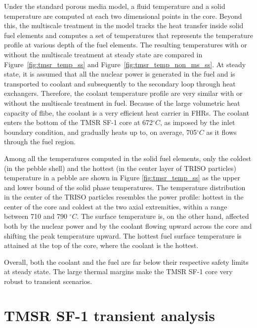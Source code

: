 \documentclass{elsarticle}
\begin{document}
Under the standard porous media model, a fluid temperature and a solid temperature are computed at each two dimensional points in the core. Beyond this, the multiscale treatment in the model tracks the heat transfer inside solid fuel elements and computes a set of temperatures that represents the temperature profile at various depth of the fuel elements. The resulting temperatures with or without the multiscale treatment at steady state are compared in Figure~\ref{fig:tmsr_temp_ss} and Figure~\ref{fig:tmsr_temp_non_ms_ss}.
At steady state, it is assumed that all the nuclear power is generated in the fuel and is transported to coolant and subsequently to the secondary loop through heat exchangers. Therefore, the coolant temperature profile are very similar with or without the multiscale treatment in fuel. 
Because of the large volumetric heat capacity of flibe, the coolant is a very efficient heat carrier in FHRs.
The coolant enters the bottom of the TMSR SF-1 core at 672$^{\circ}C$, as imposed by the inlet boundary condition, and gradually heats up to, on average, 705$^{\circ}C$ as it flows through the fuel region.

Among all the temperatures computed in the solid fuel elements, only the coldest (in the pebble shell) and the hottest (in the center layer of TRISO particles) temperature in a pebble are shown in Figure \ref{fig:tmsr_temp_ss} as the upper and lower bound of the solid phase temperatures. The temperature distribution in the center of the TRISO particles resembles the power profile: hottest in the center of the core and coldest at the two axial extremities, within a range between 710 and 790 $^{\circ}C$. 
The surface temperature is, on the other hand, affected both by the nuclear power and by the coolant flowing upward across the core and shifting the peak temperature upward. The hottest fuel surface temperature is attained at the top of the core, where the coolant is the hottest. 


Overall, both the coolant and the fuel are far below their respective safety limits at steady state. The large thermal margins make the TMSR SF-1 core very robust to transient scenarios. 




\section{TMSR SF-1 transient analysis}
\label{sec:TMSR_transients}
\end{document}
